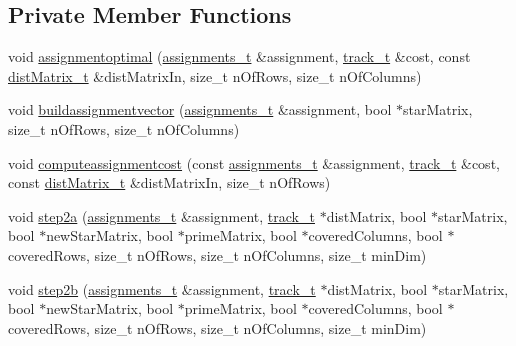 \subsection*{Private Member Functions}
\begin{DoxyCompactItemize}
\item 
void \mbox{\hyperlink{class_assignment_problem_solver_a5b84a5167984db1050821926f52b5187}{assignmentoptimal}} (\mbox{\hyperlink{_hungarian_alg_8h_ad7b9f569a9adbd958c668a36b6884ffd}{assignments\+\_\+t}} \&assignment, \mbox{\hyperlink{defines_8h_a7ce9c8817b42ab418e61756f579549ab}{track\+\_\+t}} \&cost, const \mbox{\hyperlink{_hungarian_alg_8h_af6ab0ee8259a51215f62e8f96416d5bb}{dist\+Matrix\+\_\+t}} \&dist\+Matrix\+In, size\+\_\+t n\+Of\+Rows, size\+\_\+t n\+Of\+Columns)
\item 
void \mbox{\hyperlink{class_assignment_problem_solver_a1aa1c05dec6aef723f5d41affc667a77}{buildassignmentvector}} (\mbox{\hyperlink{_hungarian_alg_8h_ad7b9f569a9adbd958c668a36b6884ffd}{assignments\+\_\+t}} \&assignment, bool $\ast$star\+Matrix, size\+\_\+t n\+Of\+Rows, size\+\_\+t n\+Of\+Columns)
\item 
void \mbox{\hyperlink{class_assignment_problem_solver_a978fa51f563d47dbd00c697704cf4ad9}{computeassignmentcost}} (const \mbox{\hyperlink{_hungarian_alg_8h_ad7b9f569a9adbd958c668a36b6884ffd}{assignments\+\_\+t}} \&assignment, \mbox{\hyperlink{defines_8h_a7ce9c8817b42ab418e61756f579549ab}{track\+\_\+t}} \&cost, const \mbox{\hyperlink{_hungarian_alg_8h_af6ab0ee8259a51215f62e8f96416d5bb}{dist\+Matrix\+\_\+t}} \&dist\+Matrix\+In, size\+\_\+t n\+Of\+Rows)
\item 
void \mbox{\hyperlink{class_assignment_problem_solver_adef6ec1494dd6058fdf1373bc2c6d6eb}{step2a}} (\mbox{\hyperlink{_hungarian_alg_8h_ad7b9f569a9adbd958c668a36b6884ffd}{assignments\+\_\+t}} \&assignment, \mbox{\hyperlink{defines_8h_a7ce9c8817b42ab418e61756f579549ab}{track\+\_\+t}} $\ast$dist\+Matrix, bool $\ast$star\+Matrix, bool $\ast$new\+Star\+Matrix, bool $\ast$prime\+Matrix, bool $\ast$covered\+Columns, bool $\ast$covered\+Rows, size\+\_\+t n\+Of\+Rows, size\+\_\+t n\+Of\+Columns, size\+\_\+t min\+Dim)
\item 
void \mbox{\hyperlink{class_assignment_problem_solver_a069b78d89842031f7b54e0837c2bd602}{step2b}} (\mbox{\hyperlink{_hungarian_alg_8h_ad7b9f569a9adbd958c668a36b6884ffd}{assignments\+\_\+t}} \&assignment, \mbox{\hyperlink{defines_8h_a7ce9c8817b42ab418e61756f579549ab}{track\+\_\+t}} $\ast$dist\+Matrix, bool $\ast$star\+Matrix, bool $\ast$new\+Star\+Matrix, bool $\ast$prime\+Matrix, bool $\ast$covered\+Columns, bool $\ast$covered\+Rows, size\+\_\+t n\+Of\+Rows, size\+\_\+t n\+Of\+Columns, size\+\_\+t min\+Dim)

\end{DoxyCompactItemize}
